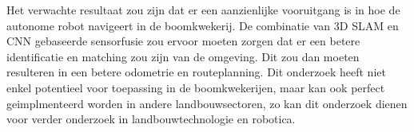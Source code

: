 
Het verwachte resultaat zou zijn dat er een aanzienlijke vooruitgang is in hoe de autonome robot navigeert in de boomkwekerij.
De combinatie van 3D SLAM en CNN gebaseerde sensorfusie zou ervoor moeten zorgen dat er een betere identificatie en matching zou zijn van de omgeving.
Dit zou dan moeten resulteren in een betere odometrie en routeplanning.
Dit onderzoek heeft niet enkel potentieel voor toepassing in de boomkwekerijen, maar kan ook perfect geimplmenteerd worden in andere landbouwsectoren, zo kan dit onderzoek dienen voor verder onderzoek in landbouwtechnologie en robotica.


